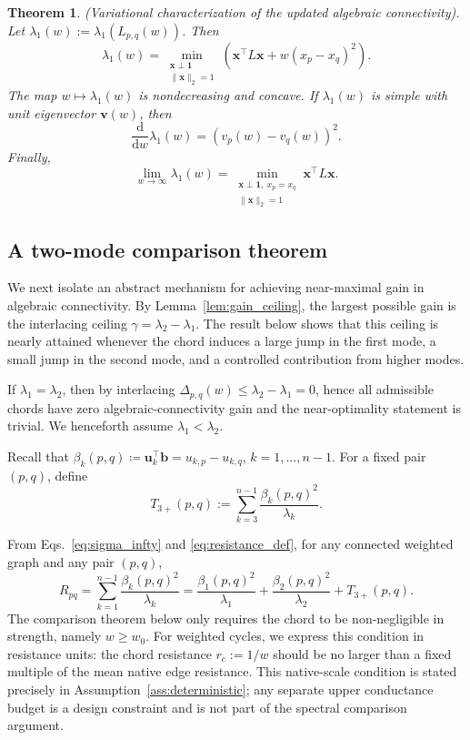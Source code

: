 \documentclass[11pt]{article}
\numberwithin{equation}{section}
\newtheorem{theorem}{Theorem}[section]
\theoremstyle{definition}
\theoremstyle{remark}
\begin{document}
\begin{theorem}\label{thm:lambda_quant}
	\emph{(Variational characterization of	the updated algebraic connectivity).}
	Let $\lambda_1(w):=\lambda_1(L_{p,q}(w))$. Then
	\begin{equation}\label{eq:var_lam_w}
		\lambda_1(w)=
		\min_{\substack{\boldsymbol{x}\perp\boldsymbol{1}\\ \|\boldsymbol{x}\|_2=1}}
		\left(\boldsymbol{x}^\top L\boldsymbol{x}+w(x_p-x_q)^2\right).
	\end{equation}
	The map $w\mapsto\lambda_1(w)$ is nondecreasing and concave. If
	$\lambda_1(w)$ is simple with unit eigenvector $\boldsymbol{v}(w)$,
	then
	\[
	\frac{\mathrm{d}}{\mathrm{d}w}\lambda_1(w)=(v_p(w)-v_q(w))^2.
	\]
	Finally,
	\[
	\lim_{w\to\infty}\lambda_1(w)=
	\min_{\substack{\boldsymbol{x}\perp\boldsymbol{1},\ x_p=x_q\\ \|\boldsymbol{x}\|_2=1}}
	\boldsymbol{x}^\top L\boldsymbol{x}.
	\]
\end{theorem}



\subsection{A two-mode comparison theorem}

We next isolate an abstract mechanism for achieving near-maximal gain in
algebraic connectivity. By Lemma~\ref{lem:gain_ceiling}, the largest
possible gain is the interlacing ceiling $\gamma=\lambda_2-\lambda_1$.
The result below shows that this ceiling is nearly attained whenever the
chord induces a large jump in the first mode, a small jump in the second
mode, and a controlled contribution from higher modes.

If $\lambda_1=\lambda_2$, then by interlacing $\Delta_{p,q}(w)\le \lambda_2-\lambda_1=0$, hence all admissible chords have zero algebraic-connectivity gain and the near-optimality statement is trivial. We henceforth assume $\lambda_1<\lambda_2$.

Recall that
$\beta_k(p,q)\coloneqq \boldsymbol{u}_k^\top\boldsymbol{b}=u_{k,p}-u_{k,q}$,
$k=1,\dots,n-1$. For a fixed pair $(p,q)$, define
\begin{equation}\label{eq:T3_tail}
	T_{3+}(p,q):=\sum_{k=3}^{n-1}\frac{\beta_k(p,q)^2}{\lambda_k}.
\end{equation}

From Eqs.~\eqref{eq:sigma_infty} and \eqref{eq:resistance_def}, for any
connected weighted graph and any pair $(p,q)$,
\begin{equation*}
	R_{pq}
	=
	\sum_{k=1}^{n-1}\frac{\beta_k(p,q)^2}{\lambda_k}
	=
	\frac{\beta_1(p,q)^2}{\lambda_1}
	+\frac{\beta_2(p,q)^2}{\lambda_2}
	+T_{3+}(p,q).
\end{equation*}
The comparison theorem below only requires the chord to be non-negligible in strength, namely $w\ge w_0$. For weighted cycles, we express this condition in resistance units: the chord resistance $r_c:=1/w$ should be no larger than a fixed multiple of the mean native edge resistance. This native-scale condition is stated precisely in Assumption~\ref{ass:deterministic}; any separate upper conductance budget is a design constraint and is not part of the spectral comparison argument.
\end{document}
